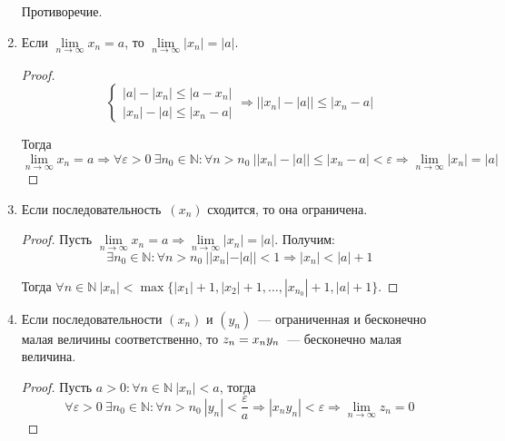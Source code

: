 \begin{enumerate}
\begin{proofcontra}
	Противоречие.
	\end{proofcontra}
	
	\item Если $\lim\limits_{n \to \infty} x_n = a$, то $\lim\limits_{n \to \infty} |x_n| = |a|$.
	\begin{proof}
	\begin{equation*}
	\begin{cases}
	|a| - |x_n| \leqslant |a - x_n| \\
	|x_n| - |a| \leqslant |x_n - a|
	\end{cases}
	\Rightarrow \bigl| |x_n| - |a| \bigr| \leqslant |x_n - a|
	\end{equation*}
	
	Тогда
	\begin{equation*}
	\lim_{n \to \infty} x_n = a \Rightarrow
	\forall \varepsilon > 0 \ \exists n_0 \in \mathbb N \colon \forall n > n_0 \ \bigl| |x_n| - |a| \bigr| \leqslant |x_n - a| < \varepsilon \Rightarrow
	\lim_{n \to \infty} |x_n| = |a|
	\end{equation*}
	\end{proof}
	
	\item Если последовательность~$(x_n)$ сходится, то она ограничена.
	\begin{proof}
	Пусть $\lim\limits_{n \to \infty} x_n = a \Rightarrow \lim\limits_{n \to \infty} |x_n| = |a|$.
	Получим:
	\begin{equation*}
	\exists n_0 \in \mathbb N \colon \forall n > n_0 \ ||x_n| - |a|| < 1 \Rightarrow |x_n| < |a| + 1
	\end{equation*}
	
	Тогда $\forall n \in \mathbb N \ |x_n| < \max \{ |x_1| + 1, |x_2| + 1, \ldots, |x_{n_0}| + 1, |a| + 1 \}$.
	\end{proof}
	
	\item Если последовательности $(x_n)$ и $(y_n)$~--- ограниченная и бесконечно малая величины соответственно, то $z_n \opbr= x_n y_n$~--- бесконечно малая величина.
	\begin{proof}
	Пусть $a > 0 \colon \forall n \in \mathbb N \ |x_n| < a$, тогда
	\begin{equation*}
	\forall \varepsilon > 0 \ \exists n_0 \in \mathbb N \colon
	\forall n > n_0 \ |y_n| < \frac\varepsilon{a} \Rightarrow
	|x_n y_n| < \varepsilon \Rightarrow
	\lim_{n \to \infty} z_n = 0
	\end{equation*}
	\end{proof}
	

\end{enumerate}

